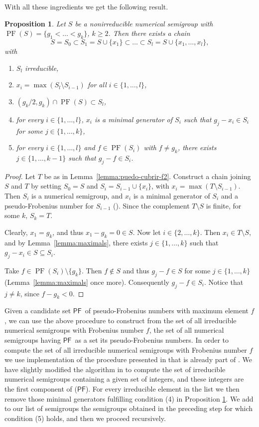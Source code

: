 \documentclass[11pt]{amsart}
\newtheorem{proposition}[theorem]{Proposition}
\theoremstyle{remark}
\begin{document}
With all these ingredients we get the following result.

\begin{proposition}\label{prop:chain}
Let $S$ be a nonirreducible numerical semigroup with $\operatorname{PF}(S)=\{g_1<\dots <g_k\}$, $k\ge 2$. Then there exists a chain
\[S=S_0\subset S_1=S\cup\{x_1\}\subset \dots \subset S_l=S\cup\{x_1,\ldots,x_l\},\]
with
\begin{enumerate}
\item $S_l$ irreducible,
\item $x_i=\max (S_l\setminus S_{i-1})$ for all $i\in\{1,\ldots, l\}$,
\item $(g_k/2,g_k)\cap \operatorname{PF}(S)\subset S_l$, 
\item for every $i\in \{1,\ldots, l\}$, $x_i$ is a minimal generator of $S_i$ such that $g_j-x_i\in S_i$ for some $j\in \{1,\ldots,k\}$,
\item for every $i\in \{1,\ldots, l\}$ and $f\in \operatorname{PF}(S_i)$ with $f\neq g_k$, there exists $j\in \{1,\ldots,k-1\}$ such that $g_j-f\in S_i$.
\end{enumerate}
\end{proposition}
\begin{proof}
Let $T$ be as in Lemma~\ref{lemma:puedo-cubrir-f2}. Construct a chain joining $S$ and $T$ by setting $S_0=S$ and $S_i=S_{i-1}\cup \{x_i\}$, with $x_i=\max(T\setminus S_{i-1})$. Then $S_i$ is a numerical semigroup, and $x_i$ is a minimal generator of $S_i$ and a pseudo-Frobenius number for $S_{i-1}$ (\cite[Lemma 4.35]{NS}). Since the complement $T\setminus S$ is finite, for some $k$, $S_k=T$. 

Clearly, $x_1=g_k$, and thus $x_1-g_k=0\in S$. Now let $i\in \{2,\ldots,k\}$. Then $x_i\in T\setminus S$, and by Lemma~\ref{lemma:maximals}, there exists $j\in\{1,\ldots, k\}$ such that $g_j-x_i\in S\subseteq S_i$. 

Take $f\in \operatorname{PF}(S_i)\setminus\{g_k\}$. Then $f\not\in S$ and thus $g_j-f\in S$ for some $j\in \{1,\ldots,k\}$ (Lemma~\ref{lemma:maximals} once more). Consequently $g_j-f\in S_i$. Notice that $j\neq k$, since $f-g_k<0$.
\end{proof}

Given a candidate set {\ensuremath{\mathsf{PF}}}\ of pseudo-Frobenius numbers with maximum element $f$, we can use the above procedure to construct from the set of all irreducible numerical semigroups with Frobenius number $f$, the set of all numerical semigroups having {\ensuremath{\mathsf{PF}}}\ as a set its pseudo-Frobenius numbers. In order to compute the set of all irreducible numerical semigroups with Frobenius number $f$ we use implementation of the procedure presented in \cite{br} that is already part of \cite{numericalsgps}. We have slightly modified the algorithm in \cite{br} to compute the set of irreducible numerical semigroups containing a given set of integers, and these integers are the first component of  \ForcedIntegers({\ensuremath{\mathsf{PF}}}). For every irreducible element in the list we then remove those minimal generators fulfilling condition (4) in Proposition \ref{prop:chain}. We add to our list of semigroups the semigroups obtained in the preceding step for which condition (5) holds, and then we proceed recursively.
\end{document}
